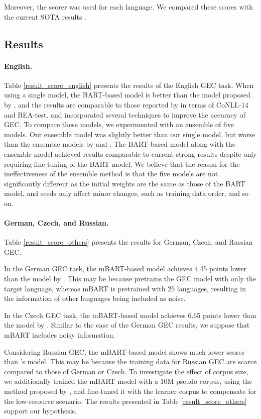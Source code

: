 \documentclass[11pt,a4paper]{article}
\begin{document}
Moreover, the  scorer was used for each language.
We compared these scores with the current SOTA results \cite{low_resource_gec}.


\subsection{Results}
\paragraph{English.}
Table \ref{result_score_english} presents the results of the English GEC task.
When using a single model, the BART-based model is better than the model proposed by \citet{kiyono2019}, and the results are comparable to those reported by \citet{kaneko_bert} in terms of CoNLL-14 and BEA-test.
\citet{kiyono2019} and \citet{kaneko_bert} incorporated several techniques to improve the accuracy of GEC.
To compare these models, we experimented with an ensemble of five models.
Our ensemble model was slightly better than our single model, but worse than the ensemble models by \citet{kiyono2019} and \citet{kaneko_bert}.
The BART-based model along with the ensemble model achieved results comparable to current strong results despite only requiring fine-tuning of the BART model.
We believe that the reason for the ineffectiveness of the ensemble method is that the five models are not significantly different
 as the initial weights are the same as those of the BART model,
 and seeds only affect minor changes, such as training data order, and so on.


\paragraph{German, Czech, and Russian.}
Table \ref{result_score_others} presents the results for German, Czech, and Russian GEC.

In the German GEC task, the mBART-based model achieves 4.45  points lower than the model by \citet{low_resource_gec}.
This may be because \citet{low_resource_gec} pretrains the GEC model with only the target language,
 whereas mBART is pretrained with 25 languages, resulting in
 the information of other languages being included as noise.

In the Czech GEC task, the mBART-based model achieves 6.65  points lower than the model by \citet{low_resource_gec}.
Similar to the case of the German GEC results, we suppose that mBART includes noisy information.

Considering Russian GEC, the mBART-based model shows much lower scores than \citet{low_resource_gec}'s model.
This may be because the training data for
 Russian GEC are scarce compared to those of German or Czech.
To investigate the effect of corpus size, we additionally trained the mBART model with a 10M pseudo corpus, using the method proposed by \citet{beasota}, and fine-tuned it with the learner corpus to compensate for the low-resource scenario.
The results presented in Table \ref{result_score_others} support our hypothesis.
\end{document}
